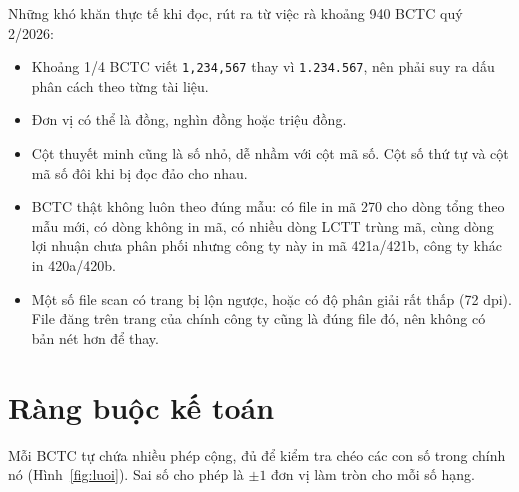 \documentclass[12pt,a4paper]{report}
\newcommand{\code}[1]{\texttt{#1}}
\begin{document}
Những khó khăn thực tế khi đọc, rút ra từ việc rà khoảng 940 BCTC quý 2/2026:
\begin{itemize}
  \item Khoảng 1/4 BCTC viết \code{1,234,567} thay vì \code{1.234.567}, nên phải suy ra dấu phân cách theo từng tài liệu.
  \item Đơn vị có thể là đồng, nghìn đồng hoặc triệu đồng.
  \item Cột thuyết minh cũng là số nhỏ, dễ nhầm với cột mã số. Cột số thứ tự và cột mã số đôi khi bị đọc đảo cho nhau.
  \item BCTC thật không luôn theo đúng mẫu: có file in mã 270 cho dòng tổng theo mẫu mới, có dòng không in mã, có nhiều
        dòng LCTT trùng mã, cùng dòng lợi nhuận chưa phân phối nhưng công ty này in mã 421a/421b, công ty khác in 420a/420b.
  \item Một số file scan có trang bị lộn ngược, hoặc có độ phân giải rất thấp (72 dpi). File đăng trên trang của chính
        công ty cũng là đúng file đó, nên không có bản nét hơn để thay.
\end{itemize}

\section{Ràng buộc kế toán}
Mỗi BCTC tự chứa nhiều phép cộng, đủ để kiểm tra chéo các con số trong chính nó (Hình~\ref{fig:luoi}). Sai số cho phép
là $\pm 1$ đơn vị làm tròn cho mỗi số hạng.
\end{document}
